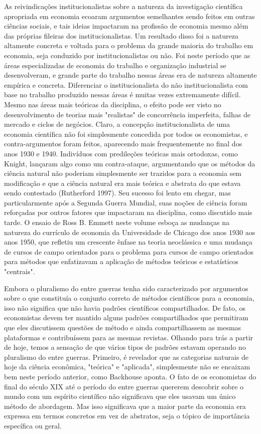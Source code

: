 \documentclass[a4paper,12pt]{article}[abntex2]
\begin{document}
As reivindicações institucionalistas sobre a natureza da investigação científica apropriada em economia ecoaram argumentos semelhantes sendo feitos em outras ciências sociais, e tais ideias impactaram na profissão de economia mesmo além das próprias fileiras dos institucionalistas. Um resultado disso foi a natureza altamente concreta e voltada para o problema da grande maioria do trabalho em economia, seja conduzido por institucionalistas ou não. Foi neste período que as áreas especializadas de economia do trabalho e organização industrial se desenvolveram, e grande parte do trabalho nessas áreas era de natureza altamente empírica e concreta. Diferenciar o institucionalista do não institucionalista com base no trabalho produzido nessas áreas é muitas vezes extremamente difícil. Mesmo nas áreas mais teóricas da disciplina, o efeito pode ser visto no desenvolvimento de teorias mais "realistas" de concorrência imperfeita, falhas de mercado e ciclos de negócios. Claro, a concepção institucionalista de uma economia científica não foi simplesmente concedida por todos os economistas, e contra-argumentos foram feitos, aparecendo mais frequentemente no final dos anos 1930 e 1940. Indivíduos com predileções teóricas mais ortodoxas, como Knight, lançaram algo como um contra-ataque, argumentando que os métodos da ciência natural não poderiam simplesmente ser trazidos para a economia sem modificação e que a ciência natural era mais teórica e abstrata do que estava sendo contestado (Rutherford 1997). Seu sucesso foi lento em chegar, mas particularmente após a Segunda Guerra Mundial, suas noções de ciência foram reforçadas por outros fatores que impactaram na disciplina, como discutido mais tarde. O ensaio de Ross B. Emmett neste volume esboça as mudanças na natureza do currículo de economia da Universidade de Chicago dos anos 1930 aos anos 1950, que refletiu um crescente ênfase na teoria neoclássica e uma mudança de cursos de campo orientados para o problema para cursos de campo orientados para métodos que enfatizavam a aplicação de métodos teóricos e estatísticos "centrais".

Embora o pluralismo do entre guerras tenha sido caracterizado por argumentos sobre o que constituía o conjunto correto de métodos científicos para a economia, isso não significa que não havia padrões científicos compartilhados. De fato, os economistas devem ter mantido alguns padrões compartilhados que permitiram que eles discutissem questões de método e ainda compartilhassem as mesmas plataformas e contribuíssem para as mesmas revistas. Olhando para trás a partir de hoje, temos a sensação de que vários tipos de padrões estavam operando no pluralismo do entre guerras. Primeiro, é revelador que as categorias naturais de hoje da ciência econômica, "teórica" e "aplicada", simplesmente não se encaixam bem neste período anterior, como Backhouse aponta. O fato de os economistas do final do século XIX até o período do entre guerras quererem descobrir sobre o mundo com um espírito científico não significava que eles usavam um único método de abordagem. Mas isso significava que a maior parte da economia era expressa em termos concretos em vez de abstratos, seja o tópico de importância específica ou geral.
\end{document}
